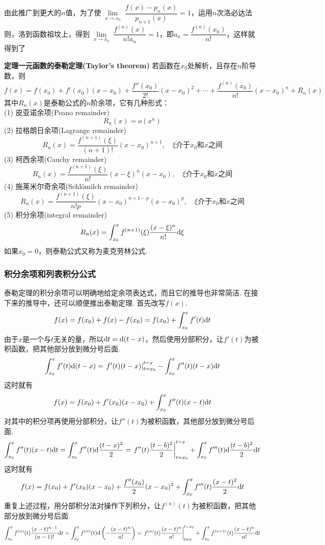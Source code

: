 \documentclass[UTF8]{ctexart}
\newcommand{\trm}[1]{{\rm #1}}
\newenvironment{theorem}[1]
    {\begin{tcolorbox}[enhanced, colback=LightYellow, breakable=true, frame hidden, borderline west={1.5mm}{-2mm}{DarkBlue}]
    {\bfseries {\color{DarkBlue} 定理}\quad #1} \newline}
    {\end{tcolorbox}}
\begin{document}
由此推广到更大的\(n\)值，为了使\(\lim \limits_{\substack{x\to x_0}}\dfrac{f(x)-p_n(x)}{p_{n+1}(x)}=1\)，运用\(n\)次洛必达法则，洛到函数祖坟上，得到\(\lim \limits_{\substack{x\to x_0}}\dfrac{f^{(n)}(x)}{n!a_n}=1\)，即\(a_n=\dfrac{f^{(n)}(x_0)}{n!}\)，这样就得到了

\begin{theorem}{一元函数的泰勒定理(Taylor's theorem)}
    若函数在\(x_0\)处解析，且存在\(n\)阶导数，则
    \[f(x) = f(x_0)+f'(x_0)(x-x_0)+\frac{f''(x_0)}{2!}(x-x_0)^2+\cdots+\frac{f^{(n)}(x_0)}{n!}(x-x_0)^n+R_n(x)\]
    其中\(R_n(x)\)是泰勒公式的\(n\)阶余项，它有几种形式：\\
    (1) 皮亚诺余项(Peano remainder)
    \[ R_n(x) = o(x^n) \]
    (2) 拉格朗日余项(Lagrange remainder)
    \[ R_n(x) = \frac{f^{(n+1)}(\xi)}{(n+1)!}(x-x_0)^{n+1}, \quad \xi\mbox{介于}x_0\mbox{和}x\mbox{之间}\]
    (3) 柯西余项(Cauchy remainder)
    \[ R_n(x) = \frac{f^{(n+1)}(\xi)}{n!}(x-\xi)^{n}(x-x_0), \quad \xi\mbox{介于}x_0\mbox{和}x\mbox{之间}\]
    (4) 施莱米尔奇余项(Schlömilch remainder)
    \[ R_n(x) = \frac{f^{(n+1)}(\xi)}{n!p}(x-x_0)^{n+1-p}(x-x_0)^p, \quad \xi\mbox{介于}x_0\mbox{和}x\mbox{之间}\]
    (5) 积分余项(integral remainder)
    \[ R_n(x) = \int_{x_0}^{x}f^{(n+1)}(\xi)\frac{(x-\xi)^{n}}{n!}\trm{d}{\xi} \]
    如果\(x_0=0\)，则泰勒公式又称为麦克劳林公式.
\end{theorem}

\subsubsection{积分余项和列表积分公式}

泰勒定理的积分余项可以明确地给定余项表达式，而且它的推导也非常简洁. 在接下来的推导中，还可以顺便推出泰勒定理. 首先改写\(f(x)\).
\[f(x)=f(x_0)+f(x)-f(x_0)=f(x_0)+\int_{x_0}^{x}f'(t)\trm{d}t\]
由于\(x\)是一个与\(t\)无关的量，所以\(\trm{d}t=\trm{d}(t-x)\)，然后使用分部积分，让\(f'(t)\)为被积函数，把其他部分放到微分号后面.
\[\int_{x_0}^{x}f'(t)\trm{d}(t-x) = \left.f'(t)(t-x)\right|_{t=x_0}^{t=x} - \int_{x_0}^{x}f''(t)(t-x)\trm{d}t\]
这时就有
\[f(x) = f(x_0)+f'(x_0)(x-x_0)+\int_{x_0}^{x}f''(t)(x-t)\trm{d}t\]
对其中的积分项再使用分部积分，让\(f''(t)\)为被积函数，其他部分放到微分号后面.
\[\int_{x_0}^{x}f''(t)(x-t)\trm{d}t = \int_{x_0}^{x}f''(t)\trm{d}\frac{(t-x)^2}{2} = \left.f''(t)\frac{(t-b)^2}{2}\right|_{t=x_0}^{t=x} + \int_{x_0}^{x}f'''(t)\trm{d}\frac{(t-b)^2}{2}\trm{d}t\]
这时就有
\[f(x) = f(x_0)+f'(x_0)(x-x_0)+\frac{f''(x_0)}{2}(x-x_0)^2+\int_{x_0}^{x}f'''(t)\frac{(x-t)^2}{2}\trm{d}t\]
重复上述过程，用分部积分法对操作下列积分，让\(f^{(n)}(t)\)为被积函数，把其他部分放到微分号后面.
\[\int_{x_0}^{x}f^{(n)}(t)\frac{(x-t)^{n-1}}{(n-1)!}\trm{d}t = \int_{x_0}^{x}f^{(n)}(t)\trm{d}\left(-\frac{(x-t)^n}{n!}\right) = \left.f^{(n)}(t)\frac{(x-t)^n}{n!}\right|_{t=x}^{t=x_0} + \int_{x_0}^{x}f^{(n+1)}(t)\frac{(x-t)^{n}}{n!}\trm{d}t\]
\end{document}
